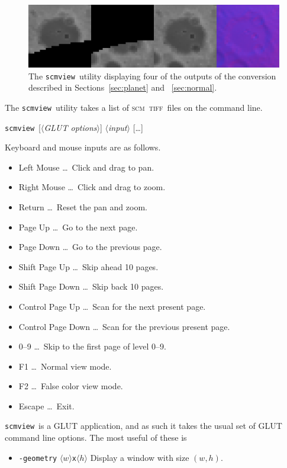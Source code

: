 \documentclass[oneside,10pt]{memoir}
\newcommand{\scm}     {\textsc{scm}}
\newcommand{\tiff}    {\textsc{tiff}}
\newcommand{\scmview} {\texttt{scmview}}
\newcommand{\inangles}[1]{$\langle$#1$\rangle$}
\newenvironment{optionlist}
  {\setlength{\leftmargini}{1in}\begin{itemize}}{\end{itemize}}
\begin{document}
\begin{Spacing}{1.1}
\begin{figure}
  \centering
  \includegraphics[width=\textwidth]{fig/scmview.png}
  \caption{The \scmview\ utility displaying four of the outputs of the conversion described in Sections~\ref{sec:planet} and ~\ref{sec:normal}.}
  \label{fig:scmview}
\end{figure}

The \scmview\ utility takes a list of \scm\ \tiff\ files on the command line.

\bigskip\noindent\scmview\ [\inangles{\textit{GLUT options}}] \inangles{\textit{input}} [\ldots]

\bigskip Keyboard and mouse inputs are as follows.

\begin{optionlist}
\item[Left Mouse] \ldots\ Click and drag to pan.
\item[Right Mouse] \ldots\ Click and drag to zoom.
\item[Return] \ldots\ Reset the pan and zoom.
\item[Page Up] \ldots\ Go to the next page.
\item[Page Down] \ldots\ Go to the previous page.
\item[Shift Page Up] \ldots\ Skip ahead 10 pages.
\item[Shift Page Down] \ldots\ Skip back 10 pages.
\item[Control Page Up] \ldots\ Scan for the next present page.
\item[Control Page Down] \ldots\ Scan for the previous present page.
\item[0--9] \ldots\ Skip to the first page of level 0--9.
\item[F1] \ldots\ Normal view mode.
\item[F2] \ldots\ False color view mode.
\item[Escape] \ldots\ Exit.
\end{optionlist}

\scmview\ is a \textsc{GLUT} application, and as such it takes the usual set of \textsc{GLUT} command line options. The most useful of these is

\begin{optionlist}
\item[\texttt{-geometry} \inangles{$w$}\texttt{x}\inangles{$h$}] Display a window with size $(w, h)$.
\end{optionlist}


\end{Spacing}
\end{document}
